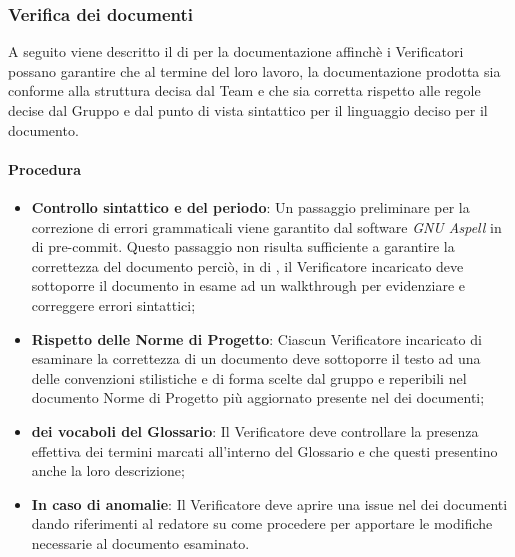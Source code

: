 \subsubsection{Verifica dei documenti}
A seguito viene descritto il  di  per la documentazione affinchè i Verificatori possano garantire che al termine del loro lavoro, la documentazione prodotta sia conforme alla struttura decisa dal Team e che sia corretta rispetto alle regole decise dal Gruppo e dal punto di vista sintattico per il linguaggio deciso per il documento.

\paragraph*{Procedura}
\begin{itemize}
\item \textbf{Controllo sintattico e del periodo}: Un passaggio preliminare per la correzione di errori grammaticali viene garantito dal software \textit{GNU Aspell} in  di pre-commit. Questo passaggio non risulta sufficiente a garantire la correttezza del documento perciò, in  di , il Verificatore incaricato deve sottoporre il documento in esame ad un walkthrough per evidenziare e correggere errori sintattici;
  \item \textbf{Rispetto delle Norme di Progetto}: Ciascun Verificatore incaricato di esaminare la correttezza di un documento deve sottoporre il testo ad una  delle convenzioni stilistiche e di forma scelte dal gruppo e reperibili nel documento Norme di Progetto pi\`u aggiornato presente nel  dei documenti;
  \item \textbf{ dei vocaboli del Glossario}: Il Verificatore deve controllare la presenza effettiva dei termini marcati all'interno del Glossario e che questi presentino anche la loro descrizione;
  \item \textbf{In caso di anomalie}: Il Verificatore deve aprire una issue nel  dei documenti dando riferimenti al redatore su come procedere per apportare le modifiche necessarie al documento esaminato.
\end{itemize}
